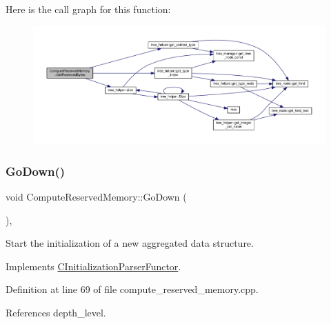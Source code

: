 Here is the call graph for this function\+:
\nopagebreak
\begin{figure}[H]
\begin{center}
\leavevmode
\includegraphics[width=350pt]{d5/de4/classComputeReservedMemory_a2563b08ab753dea5d8c55708d63e3318_cgraph}
\end{center}
\end{figure}
\mbox{\label{classComputeReservedMemory_aad5d8055485eb76d21ee52ce5a4d18c7}} 
\subsubsection{\texorpdfstring{Go\+Down()}{GoDown()}}
{\footnotesize\ttfamily void Compute\+Reserved\+Memory\+::\+Go\+Down (\begin{DoxyParamCaption}{ }\end{DoxyParamCaption})\hspace{0.3cm}{\ttfamily [override]}, {\ttfamily [virtual]}}



Start the initialization of a new aggregated data structure. 



Implements \hyperlink{classCInitializationParserFunctor_acd23f951887db083c2c02d4e0865e260}{C\+Initialization\+Parser\+Functor}.



Definition at line 69 of file compute\+\_\+reserved\+\_\+memory.\+cpp.



References depth\+\_\+level.

\mbox{\label{classComputeReservedMemory_a091e52fa0cbf1db832a824c11c7c75d2}} 
